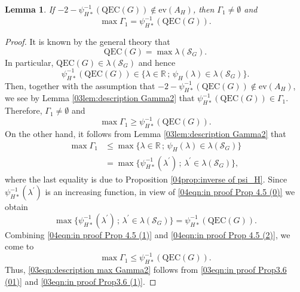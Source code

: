 \documentclass[12pt,a4paper]{article}
\newtheorem{lemma}[theorem]{Lemma}
\newcommand{\1}{{\bm 1}}
\numberwithin{equation}{section}
\begin{document}
\begin{lemma}\label{04lem:description Gamma1}
If $-2-\psi_{H*}^{-1}(\mathrm{QEC}(G)) \not\in\mathrm{ev}(A_H)$,
then $\Gamma_1\neq\emptyset$ and
%
\begin{equation}\label{03eqn:description max Gamma2}
\max \Gamma_1=\psi_{H*}^{-1}(\mathrm{QEC}(G)).
\end{equation}
\end{lemma}

\begin{proof}
It is known by the general theory that 
%
\begin{equation}\label{04eqn:in proof Prop 4.5 (0)}
\mathrm{QEC}(G)=\max\lambda(\mathcal{S}_G).
\end{equation}
%
In particular, $\mathrm{QEC}(G)\in \lambda(\mathcal{S}_G)$
and hence
\[
\psi_{H*}^{-1}(\mathrm{QEC}(G))\in
\{\lambda\in\mathbb{R}\,;\,
  \psi_H(\lambda)\in \lambda(\mathcal{S}_G)\}.
\]
Then, together with the assumption that
$-2-\psi_{H*}^{-1}(\mathrm{QEC}(G)) \not\in\mathrm{ev}(A_H)$,
we see by Lemma \ref{03lem:description Gamma2}
that $\psi_{H*}^{-1}(\mathrm{QEC}(G))\in \Gamma_1$.
Therefore, $\Gamma_1\neq\emptyset$ and
%
\begin{equation}\label{03eqn:in proof Prop3.6 (01)}
\max\Gamma_1
\ge\psi_{H*}^{-1}(\mathrm{QEC}(G)).
\end{equation}
%
On the other hand,
it follows from Lemma \ref{03lem:description Gamma2}
that
%
\begin{align}
\max\Gamma_1
&\le \max\{\lambda\in\mathbb{R}\,;\,
  \psi_H(\lambda)\in \lambda(\mathcal{S}_G)\}
\nonumber \\
&=\max \{\psi_{H*}^{-1}(\lambda^\prime)\,;\,
\lambda^\prime\in \lambda(\mathcal{S}_G)\},
\label{04eqn:in proof Prop 4.5 (1)}
\end{align}
where the last equality is due to Proposition
\ref{04prop:inverse of psi_H}.
Since $\psi_{H*}^{-1}(\lambda^\prime)$ is an increasing function,
in view of \eqref{04eqn:in proof Prop 4.5 (0)} we obtain
%
\begin{equation}\label{04eqn:in proof Prop 4.5 (2)}
\max \{\psi_{H*}^{-1}(\lambda^\prime)\,;\,
\lambda^\prime\in \lambda(\mathcal{S}_G)\}
=\psi_{H*}^{-1}(\mathrm{QEC}(G)).
\end{equation}
%
Combining \eqref{04eqn:in proof Prop 4.5 (1)}
and \eqref{04eqn:in proof Prop 4.5 (2)},
we come to
%
\begin{equation}\label{03eqn:in proof Prop3.6 (1)}
\max\Gamma_1
\le\psi_{H*}^{-1}(\mathrm{QEC}(G)).
\end{equation}
%
Thus, \eqref{03eqn:description max Gamma2} follows from
\eqref{03eqn:in proof Prop3.6 (01)} and
\eqref{03eqn:in proof Prop3.6 (1)}.
\end{proof}
\end{document}
